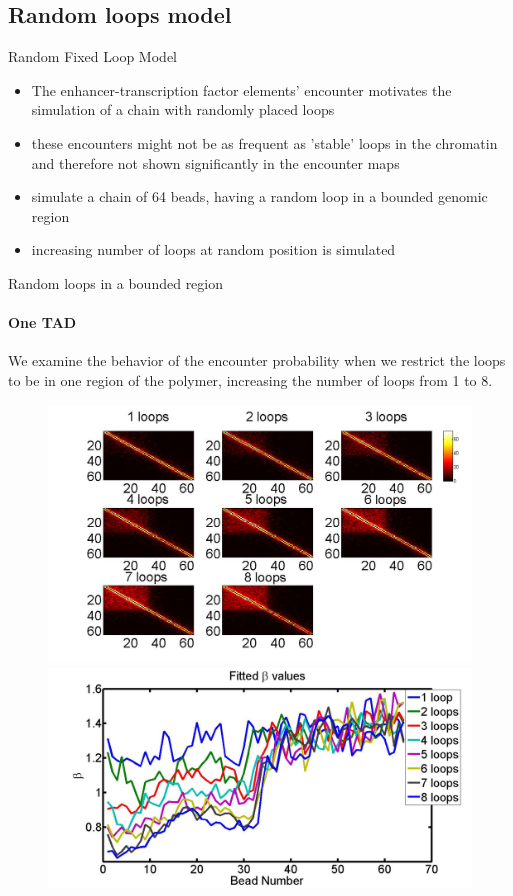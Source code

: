 \documentclass[8pt]{beamer}
\begin{document}
\subsection{Random loops model}\label{subsection_randomLoopsModel}
\begin{frame}{Random Fixed Loop Model}
\begin{itemize}
\item The enhancer-transcription factor elements' encounter motivates the simulation of a chain with randomly placed loops
\item these encounters might not be as frequent as 'stable' loops in the chromatin and therefore not shown significantly in the encounter maps
\item simulate a chain of 64 beads, having a random loop in a bounded genomic region
\item increasing number of loops at random position is simulated 
\end{itemize}

\end{frame}

\begin{frame}{Random loops in a bounded region}
\framesubtitle{One TAD}
We examine the behavior of the encounter probability when we restrict the loops to be in one region of the polymer, increasing the number of loops from 1 to 8.
\begin{figure}[H]
\includegraphics[scale=0.13]{encounterHistogramOneTAD_1to8Loops}
\includegraphics[scale=0.13]{fittedExpOneTAD1To8Loops}
\end{figure}
\end{frame}
\end{document}
